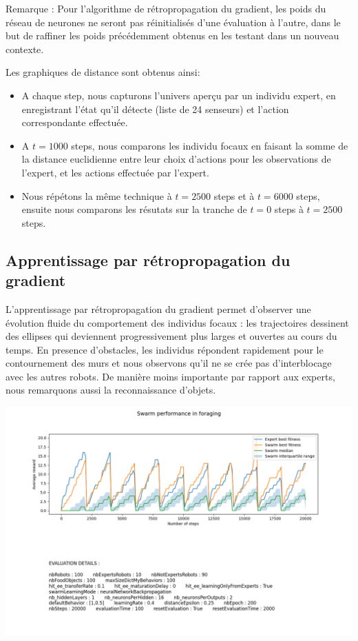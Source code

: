 \documentclass[a4paper, 12pt]{report}
\begin{document}
    Remarque : Pour l'algorithme de rétropropagation du gradient, les poids du réseau de neurones ne seront pas réinitialisés d'une évaluation à l'autre, dans le but de raffiner les poids précédemment obtenus en les testant dans un nouveau contexte.
    
    Les graphiques de distance sont obtenus ainsi:
    \begin{itemize}
        \item A chaque step, nous capturons l'univers aperçu par un individu expert, en enregistrant l'état qu'il détecte (liste de 24 senseurs) et l'action correspondante effectuée.
        \item A $t = 1000$ steps, nous comparons les individu focaux en faisant la somme de la distance euclidienne entre leur choix d'actions pour les observations de l'expert, et les actions effectuée par l'expert.
        \item Nous répétons la même technique à $t = 2500$ steps et à $t = 6000$ steps, ensuite nous comparons les résutats sur la tranche de $t = 0$ steps à $t = 2500$ steps.
    \end{itemize}


	
	
    \subsection{Apprentissage par rétropropagation du gradient}
    
    L'apprentissage par rétropropagation du gradient permet d'observer une évolution fluide du comportement des individus focaux : les trajectoires dessinent des ellipses qui deviennent progressivement plus larges et ouvertes au cours du temps. En presence d'obstacles, les individus répondent rapidement pour le contournement des murs et nous observons qu'il ne se crée pas d'interblocage avec les autres robots. De manière moins importante par rapport aux experts, nous remarquons aussi la reconnaissance d'objets.
    
    \includegraphics[scale=0.5]{images/data_performance_20000_100_bp.png}
    
\end{document}
